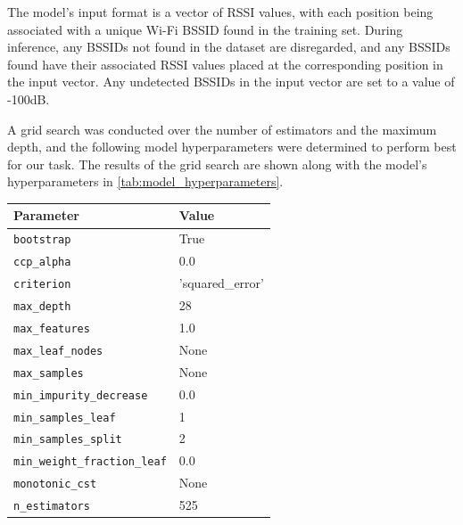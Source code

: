 The model's input format is a vector of RSSI values, with each position being associated with a unique Wi-Fi BSSID found in the training set. During inference, any BSSIDs not found in the dataset are disregarded, and any BSSIDs found have their associated RSSI values placed at the corresponding position in the input vector. Any undetected BSSIDs in the input vector are set to a value of -100dB.
\par

A grid search was conducted over the number of estimators and the maximum depth, and the following model hyperparameters were determined to perform best for our task. The results of the grid search are shown along with the model's hyperparameters in \cref{tab:model_hyperparameters}.
\par
\begin{table}[h!]
\centering
\renewcommand{\arraystretch}{1.1} %
\setlength{\tabcolsep}{8pt}       %
\begin{tabular}{|l|l|}
\hline
\textbf{Parameter}                 & \textbf{Value}             \\ \hline
\texttt{bootstrap}                 & True                       \\ \hline
\texttt{ccp\_alpha}                & 0.0                        \\ \hline
\texttt{criterion}                 & 'squared\_error'           \\ \hline
\texttt{max\_depth}                & 28                         \\ \hline
\texttt{max\_features}             & 1.0                        \\ \hline
\texttt{max\_leaf\_nodes}          & None                       \\ \hline
\texttt{max\_samples}              & None                       \\ \hline
\texttt{min\_impurity\_decrease}   & 0.0                        \\ \hline
\texttt{min\_samples\_leaf}        & 1                          \\ \hline
\texttt{min\_samples\_split}       & 2                          \\ \hline
\texttt{min\_weight\_fraction\_leaf} & 0.0                      \\ \hline
\texttt{monotonic\_cst}            & None                       \\ \hline
\texttt{n\_estimators}             & 525                        \\ \hline

\end{tabular}
\end{table}
